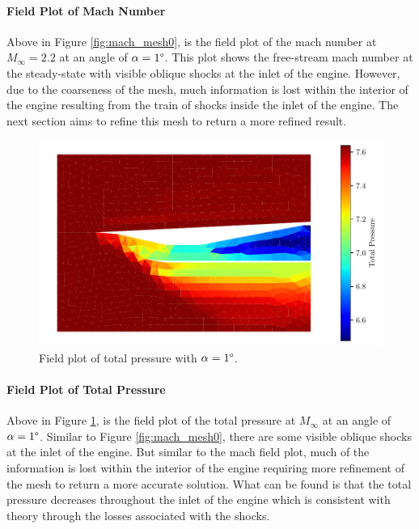\paragraph{Field Plot of Mach Number} Above in Figure \ref{fig:mach_mesh0}, is the field plot of the mach number at $M_\infty = 2.2$ at an angle of $\alpha=1\degree$. This plot shows the free-stream mach number at the steady-state with visible oblique shocks at the inlet of the engine. However, due to the coarseness of the mesh, much information is lost within the interior of the engine resulting from the train of shocks inside the inlet of the engine. The next section aims to refine this mesh to return a more refined result.

\pagebreak
\begin{figure}[h]
    \centering
    \includegraphics[width = 0.9\linewidth]{rep/q3/Pfield.pdf}
    \caption[Field Plot of Total Pressure for Baseline Mesh]{Field plot of total pressure with $\alpha = 1\degree$.}
    \label{fig:pt_mesh0}
\end{figure}

\paragraph{Field Plot of Total Pressure} Above in Figure \ref{fig:pt_mesh0}, is the field plot of the total pressure at $M_\infty$ at an angle of $\alpha=1\degree$. Similar to Figure \ref{fig:mach_mesh0}, there are some visible oblique shocks at the inlet of the engine. But similar to the mach field plot, much of the information is lost within the interior of the engine requiring more refinement of the mesh to return a more accurate solution. What can be found is that the total pressure decreases throughout the inlet of the engine which is consistent with theory through the losses associated with the shocks.